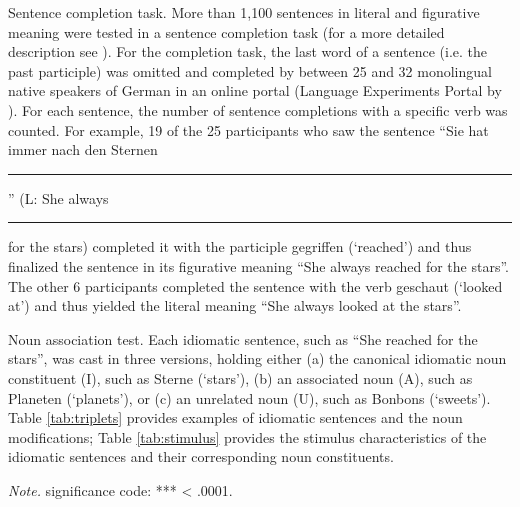 \documentclass[output=paper]{langsci/langscibook}
\begin{document}
Sentence completion task. More than 1,100 sentences in literal and figurative meaning were tested in a sentence completion task (for a more detailed description see \citet{smolka:2007}). For the completion task, the last word of a sentence (i.e. the past participle) was omitted and completed by between 25 and 32 monolingual native speakers of German in an online portal (Language Experiments Portal by \citet{keller:1998}). For each sentence, the number of sentence completions with a specific verb was counted. For example, 19 of the 25 participants who saw the sentence “Sie hat immer nach den Sternen \noindent\rule{1cm}{0.4pt}” (L: She always \noindent\rule{1cm}{0.4pt} for the stars) completed it with the participle gegriffen (‘reached’) and thus finalized the sentence in its figurative meaning “She always reached for the stars”. The other 6 participants completed the sentence with the verb geschaut (‘looked at’) and thus yielded the literal meaning “She always looked at the stars”.

Noun association test.  Each idiomatic sentence, such as “She reached for the stars”, was cast in three versions, holding either (a) the canonical idiomatic noun constituent (I), such as Sterne (‘stars’), (b) an associated noun (A), such as Planeten (‘planets’), or (c) an unrelated noun (U), such as Bonbons (‘sweets’). Table \ref{tab:triplets} provides examples of idiomatic sentences and the noun modifications; Table \ref{tab:stimulus} provides the stimulus characteristics of the idiomatic sentences and their corresponding noun constituents. 


\begin{table}[]
\caption{\textit{Idiomatic Sentences and Stimulus Characteristics of the Idiomatic, Modified, and Unrelated Noun Constituents in Experiment 1.}}
\label{tab:stimulus}
\footnotesize{\textit{Note.} significance code: *** < .0001.}
\end{table}
\end{document}
